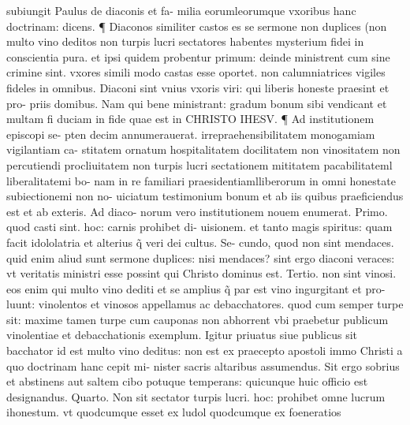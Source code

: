 \documentclass{article}
\begin{document}
\begin{pages}
subiungit Paulus de diaconis et fa- milia eorumleorumque vxoribus hanc doctrinam: dicens. ¶ Diaconos similiter castos es se sermone non duplices (non multo vino deditos non turpis lucri sectatores habentes mysterium fidei in conscientia pura. et ipsi quidem probentur primum: deinde ministrent  cum sine crimine sint. vxores simili modo castas esse oportet. non calumniatrices vigiles  fideles in omnibus. Diaconi sint vnius vxoris viri: qui liberis honeste praesint et pro- priis domibus. Nam qui bene ministrant: gradum bonum sibi vendicant et multam fi duciam in fide quae est in CHRISTO IHESV. ¶ Ad institutionem episcopi se- pten decim annumerauerat. irrepraehensibilitatem monogamiam vigilantiam ca- stitatem ornatum hospitalitatem docilitatem non vinositatem non percutiendi procliuitatem non turpis lucri sectationem mititatem pacabilitateml liberalitatemi bo- nam in re familiari praesidentiamlliberorum in omni honestate subiectionemi non no- uiciatum testimonium bonum et ab iis quibus praeficiendus est et ab exteris. Ad diaco- norum vero institutionem nouem enumerat. Primo. quod casti sint. hoc: carnis prohibet di- uisionem. et tanto magis spiritus: quam facit idololatria et alterius q̃ veri dei cultus. Se- cundo, quod non sint mendaces. quid enim aliud sunt sermone duplices: nisi mendaces? sint ergo diaconi veraces: vt veritatis ministri esse possint qui Christo dominus est. Tertio. non sint vinosi. eos enim qui multo vino dediti et se amplius q̃ par est vino ingurgitant et pro- luunt: vinolentos et vinosos appellamus ac debacchatores. quod cum semper turpe sit: maxime tamen turpe cum cauponas non abhorrent vbi praebetur publicum vinolentiae et debacchationis exemplum. Igitur priuatus siue publicus sit bacchator id est multo vino deditus: non est ex praecepto apostoli immo Christi a quo doctrinam hanc cepit mi- nister sacris altaribus assumendus. Sit ergo sobrius et abstinens aut saltem cibo potuque  temperans: quicunque huic officio est designandus. Quarto. Non sit sectator turpis lucri. hoc: prohibet omne lucrum ihonestum. vt quodcumque esset ex ludol quodcumque ex foeneratios  \pend

\end{pages}
\end{document}

